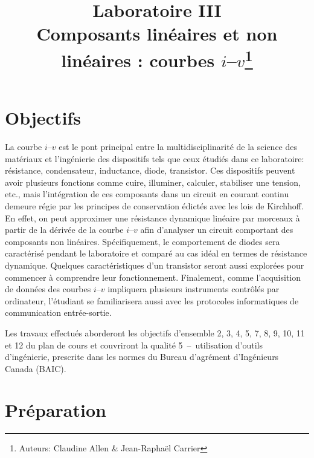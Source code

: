 \documentclass[canadien,12pt,oneside,letterpaper]{article}
\title{\textbf{Laboratoire III}\\Composants linéaires et non linéaires : courbes $i$--$v$\thanks{Auteurs: Claudine Allen \& Jean-Raphaël Carrier}}
\date{}
\begin{document}
\maketitle \vspace{-1cm}

\section{Objectifs}

La courbe $i$--$v$ est le pont principal entre la multidisciplinarité de la science des matériaux et l’ingénierie des dispositifs tels que ceux étudiés dans ce laboratoire: résistance, condensateur, inductance, diode, transistor. Ces dispositifs peuvent avoir plusieurs fonctions comme cuire, illuminer, calculer, stabiliser une tension, etc., mais l’intégration de ces composants dans un circuit en courant continu demeure régie par les principes de conservation édictés avec les lois de Kirchhoff. En effet, on peut approximer une résistance dynamique linéaire par morceaux à partir de la dérivée de la courbe $i$--$v$ afin d’analyser un circuit comportant des composants non linéaires. Spécifiquement, le comportement de diodes sera caractérisé pendant le laboratoire et comparé au cas idéal en termes de résistance dynamique. Quelques caractéristiques d’un transistor seront aussi explorées pour commencer à comprendre leur fonctionnement. Finalement, comme l’acquisition de données des courbes $i$--$v$ impliquera plusieurs instruments contrôlés par ordinateur, l’étudiant se familiarisera aussi avec les protocoles informatiques de communication entrée-sortie.

Les travaux effectués aborderont les objectifs d’ensemble 2, 3, 4, 5, 7, 8, 9, 10, 11 et 12 du plan de cours et couvriront la qualité 5~--~utilisation d’outils d’ingénierie, prescrite dans les normes du Bureau d’agrément d’Ingénieurs Canada (BAIC). 

\newpage
\section{Préparation}
\end{document}
